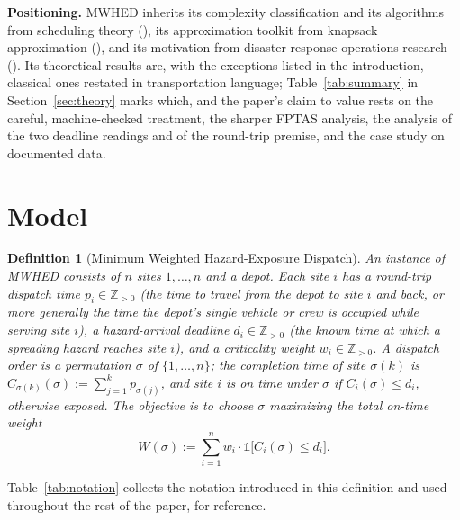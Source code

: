 \documentclass[pdflatex,sn-mathphys-ay]{sn-jnl}
\theoremstyle{thmstyleone}
\theoremstyle{thmstyletwo}
\newtheorem{definition}{Definition}
\theoremstyle{thmstylethree}
\begin{document}
\textbf{Positioning.} MWHED inherits its complexity classification and
its algorithms from scheduling theory
(\citealp{moore1968,lawlermoore1969,lawler1976,dessouky1990,karp1972,sahni1976,gensl1981,hejl2022,hermelin2024,heegerhermelin2024}),
its approximation toolkit from knapsack approximation
(\citealp{ibarrakim1975,lawler1979,kellerer1999,jin2019,chen2025fptas}),
and its motivation from disaster-response operations research
(\citealp{rachaniotis2006,harris2023,avci2024,alvelos2025,granda2025,delazeri2026,tezcan2025,rostamian2026}).
Its theoretical results are, with the exceptions listed in the
introduction, classical ones restated in transportation language;
Table~\ref{tab:summary} in Section~\ref{sec:theory} marks which, and the
paper's claim to value rests on the careful, machine-checked treatment, the
sharper FPTAS analysis, the analysis of the two deadline readings and of
the round-trip premise, and the case study on documented data.

\section{Model}\label{sec:model}

\begin{definition}[Minimum Weighted Hazard-Exposure Dispatch]\label{def:mwhed}
An instance of MWHED consists of $n$ sites $1,\dots,n$ and a depot. Each
site $i$ has a round-trip dispatch time $p_i \in \mathbb Z_{>0}$ (the
time to travel from the depot to site $i$ and back, or more generally
the time the depot's single vehicle or crew is occupied while serving
site $i$), a hazard-arrival deadline $d_i \in \mathbb Z_{>0}$ (the known
time at which a spreading hazard reaches site $i$), and a criticality
weight $w_i \in \mathbb Z_{>0}$. A \emph{dispatch order} is a
permutation $\sigma$ of $\{1,\dots,n\}$; the \emph{completion time} of
site $\sigma(k)$ is $C_{\sigma(k)}(\sigma) := \sum_{j=1}^k
p_{\sigma(j)}$, and site $i$ is \emph{on time} under $\sigma$ if $C_i(\sigma)
\le d_i$, otherwise \emph{exposed}. The objective is to choose $\sigma$
maximizing the total on-time weight
\begin{equation}\label{eq:objective}
W(\sigma) := \sum_{i=1}^n w_i \cdot \mathbb 1\bigl[C_i(\sigma) \le
d_i\bigr].
\end{equation}
\end{definition}

Table~\ref{tab:notation} collects the notation introduced in this
definition and used throughout the rest of the paper, for reference.
\end{document}
